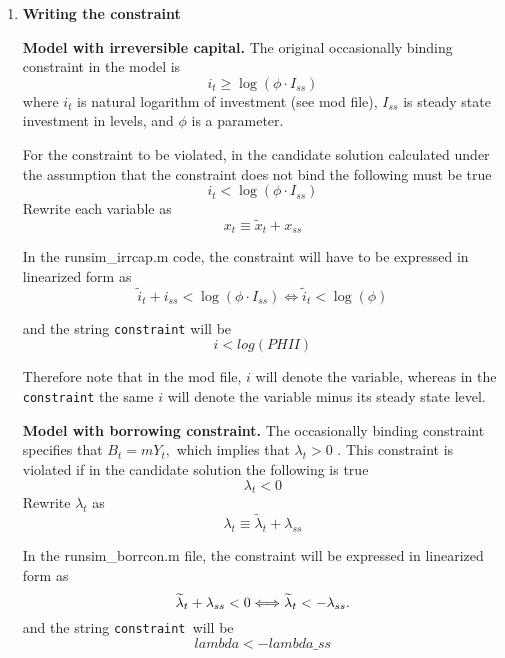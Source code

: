 \documentclass[12pt]{article}
\begin{document}
\begin{enumerate}
\item \textbf{Writing the constraint}

\textbf{Model with irreversible capital. }The original occasionally binding
constraint in the model is 
\begin{equation*}
i_{t}\geq \log \left( \phi \cdot I_{ss}\right)
\end{equation*}%
where $i_{t}$ is natural logarithm of investment (see mod file), $I_{ss}$ is
steady state investment in levels, and $\phi $ is a parameter.

For the constraint to be violated, in the candidate solution calculated
under the assumption that the constraint does not bind the following must be
true%
\begin{equation*}
i_{t}<\log \left( \phi \cdot I_{ss}\right)
\end{equation*}%
Rewrite each variable as%
\begin{equation*}
x_{t}\equiv \widetilde{x}_{t}+x_{ss}
\end{equation*}

In the runsim\_irrcap.m code, the constraint will have to be expressed in
linearized form as%
\begin{equation*}
\widetilde{i}_{t}+i_{ss}<\log \left( \phi \cdot I_{ss}\right)
\Longleftrightarrow \widetilde{i}_{t}<\log \left( \phi \right)
\end{equation*}

and the string \texttt{constraint} will be 
\begin{equation*}
i<log(PHII)
\end{equation*}

Therefore note that in the mod file, $i$ will denote the variable, whereas
in the \texttt{constraint} the same $i$ will denote the variable minus its
steady state level.

\textbf{Model with borrowing constraint. }The occasionally binding
constraint specifies that $B_{t}=mY_{t},$ which implies that $\lambda _{t}>0$%
. This constraint is violated if in the candidate solution the following is
true%
\begin{equation*}
\lambda _{t}<0
\end{equation*}%
Rewrite $\lambda _{t}$ as%
\begin{equation*}
\lambda _{t}\equiv \widetilde{\lambda }_{t}+\lambda _{ss}
\end{equation*}

In the runsim\_borrcon.m file, the constraint will be expressed in
linearized form as%
\begin{equation*}
\widetilde{\lambda }_{t}+\lambda _{ss}<0\Longleftrightarrow \widetilde{%
\lambda }_{t}<-\lambda _{ss}\text{.}
\end{equation*}%
and the string \texttt{constraint }will be%
\begin{equation*}
lambda<-lambda\_ss
\end{equation*}


\end{enumerate}
\end{document}
